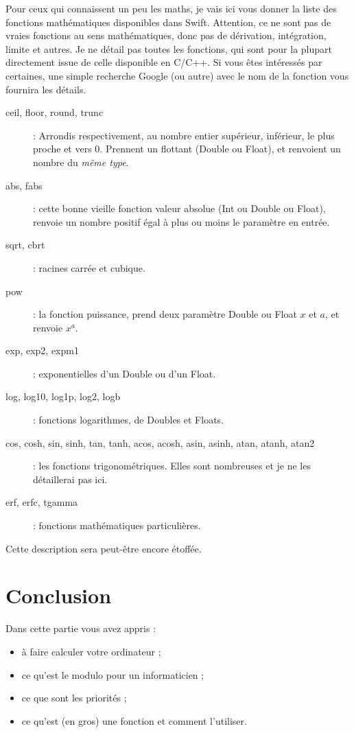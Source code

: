 Pour ceux qui connaissent un peu les maths, je vais ici vous donner la liste des fonctions mathématiques disponibles dans Swift. Attention, ce ne sont pas de vraies fonctions au sens mathématiques, donc pas de dérivation, intégration, limite et autres.
Je ne détail pas toutes les fonctions, qui sont pour la plupart directement issue de celle disponible en C/C++.
Si vous êtes intéressés par certaines, une simple recherche Google (ou autre) avec le nom de la fonction vous fournira les détails.
\begin{description}
\item[ceil, floor, round, trunc]
: Arrondis respectivement, au nombre entier supérieur, inférieur, le plus proche et vers 0. Prennent un flottant (Double ou Float), et renvoient un nombre du \emph{même type}.
\item[abs, fabs]
: cette bonne vieille fonction valeur absolue (Int ou Double ou Float), renvoie un nombre positif égal à plus ou moins le paramètre en entrée.
\item[sqrt, cbrt]
: racines carrée et cubique.
\item[pow]
: la fonction puissance, prend deux paramètre Double ou Float $x$ et $a$, et renvoie $x^{a}$. %
\item[exp, exp2, expm1]
: exponentielles d'un Double ou d'un Float.
\item[log, log10, log1p, log2, logb]
: fonctions logarithmes, de Doubles et Floats.
\item[cos, cosh, sin, sinh, tan, tanh, acos, acosh, asin, asinh, atan, atanh, atan2]
: les fonctions trigonométriques. Elles sont nombreuses et je ne les détaillerai pas ici.
\item[erf, erfc, tgamma]
: fonctions mathématiques particulières.
\end{description}
Cette description sera peut-être encore étoffée.
\section*{Conclusion}
{}
Dans cette partie vous avez appris :
\begin{itemize}
\item à faire calculer votre ordinateur ;
\item ce qu'est le modulo pour un informaticien ;
\item ce que sont les priorités ;
\item ce qu'est (en gros) une fonction et comment l'utiliser.
\end{itemize}
